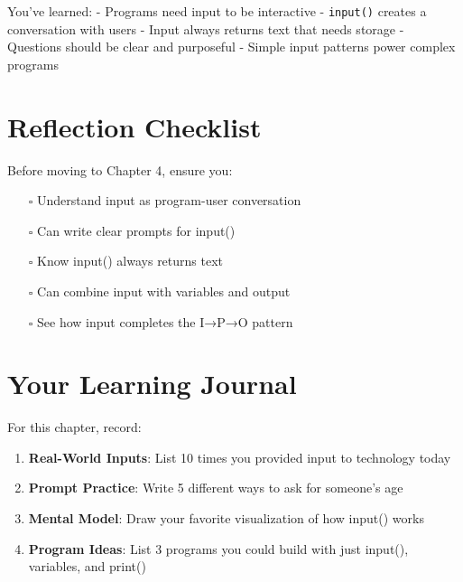 \documentclass[
  letterpaper,
  DIV=11,
  numbers=noendperiod,
  oneside]{scrreprt}
\providecommand{\tightlist}{%
  \setlength{\itemsep}{0pt}\setlength{\parskip}{0pt}}\usepackage{longtable,booktabs,array}
\begin{document}
You've learned: - Programs need input to be interactive -
\texttt{input()} creates a conversation with users - Input always
returns text that needs storage - Questions should be clear and
purposeful - Simple input patterns power complex programs

\section{Reflection Checklist}\label{reflection-checklist-2}

Before moving to Chapter 4, ensure you:

\begin{itemize}
\tightlist
\item[$\square$]
  Understand input as program-user conversation
\item[$\square$]
  Can write clear prompts for input()
\item[$\square$]
  Know input() always returns text
\item[$\square$]
  Can combine input with variables and output
\item[$\square$]
  See how input completes the I→P→O pattern
\end{itemize}

\section{Your Learning Journal}\label{your-learning-journal-3}

For this chapter, record:

\begin{enumerate}
\def\labelenumi{\arabic{enumi}.}
\tightlist
\item
  \textbf{Real-World Inputs}: List 10 times you provided input to
  technology today
\item
  \textbf{Prompt Practice}: Write 5 different ways to ask for someone's
  age
\item
  \textbf{Mental Model}: Draw your favorite visualization of how input()
  works
\item
  \textbf{Program Ideas}: List 3 programs you could build with just
  input(), variables, and print()
\end{enumerate}
\end{document}
